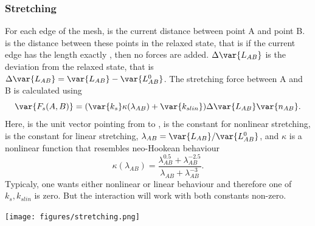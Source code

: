 \subsubsection*{Stretching} For each edge of the mesh,  is the current distance between point A 
and point B.  is the distance between these points in the relaxed 
state, that is if the current edge has the length exactly , then 
no forces are added. $\Delta \var{L_{AB}}$ is the deviation from the relaxed 
state, that is $\Delta \var{L_{AB}} = \var{L_{AB}} - \var{L_{AB}^0}$. The 
stretching force between A and B is calculated using 
\begin{equation}
\var{F_s(A,B)} = (\var{k_s}\kappa(\lambda_{AB}) + \var{k_{slin}})\Delta \var{L_{AB}}\var{n_{AB}}.
\end{equation}
Here,  is the unit vector pointing from  to ,  
is the constant for nonlinear stretching,  
is the constant for linear stretching, $\lambda_{AB} = \var{L_{AB}}/\var{L_{AB}^0}$, and 
$\kappa$ is a nonlinear function that resembles neo-Hookean behaviour
\begin{equation}
\kappa(\lambda_{AB}) = \frac{\lambda_{AB}^{0.5} + \lambda_{AB}^{-2.5}}
{\lambda_{AB} + \lambda_{AB}^{-3}}.
\end{equation}
Typicaly, one wants either nonlinear or linear behaviour and therefore one of $k_s, k_{slin}$ is zero. But the interaction will work with both constants non-zero. 
\begin{center}
  \texttt{[image: figures/stretching.png]}
\end{center}





